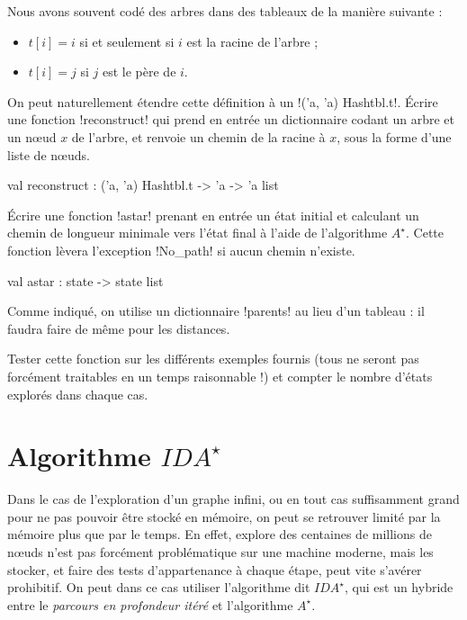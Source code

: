 \begin{ques}
  Nous avons souvent codé des arbres dans des tableaux de la manière
  suivante :
  \begin{itemize}
    \item $t[i] = i$ si et seulement si $i$ est la racine de l'arbre ;
    \item $t[i] = j$ si $j$ est le père de $i$.
  \end{itemize}
  On peut naturellement étendre cette définition à un
  \ml!('a, 'a) Hashtbl.t!. Écrire une fonction \ml!reconstruct!
  qui prend en entrée un dictionnaire codant un arbre et un
  nœud $x$ de l'arbre, et renvoie un chemin de la racine à $x$,
  sous la forme d'une liste de nœuds.
\begin{ocaml}
val reconstruct : ('a, 'a) Hashtbl.t -> 'a -> 'a list
\end{ocaml}
\end{ques}

\begin{ques}
  Écrire une fonction \ml!astar! prenant en entrée un état initial
  et calculant un chemin de longueur minimale vers l'état final à
  l'aide de l'algorithme $A^{\star}$. Cette fonction lèvera l'exception
  \ml!No_path! si aucun chemin n'existe.
\begin{ocaml}
val astar : state -> state list
\end{ocaml}
  \begin{rem}
    Comme indiqué, on utilise un dictionnaire \ml!parents!
    au lieu d'un tableau : il faudra faire de même pour les
    distances.
  \end{rem}
\end{ques}

\begin{ques}
  Tester cette fonction sur les différents exemples fournis (tous ne seront
  pas forcément traitables en un temps raisonnable !) et compter le
  nombre d'états explorés dans chaque cas.
\end{ques}


\section{Algorithme $IDA^{\star}$}

Dans le cas de l'exploration d'un graphe infini, ou en tout cas suffisamment
grand pour ne pas pouvoir être stocké en mémoire, on peut se retrouver limité
par la mémoire plus que par le temps. En effet, explore des centaines de
millions de nœuds n'est pas forcément problématique sur une machine moderne,
mais les stocker, et faire des tests d'appartenance à chaque étape, peut
vite s'avérer prohibitif. On peut dans ce cas utiliser l'algorithme dit
$IDA^{\star}$, qui est un hybride entre le \emph{parcours en profondeur itéré}
et l'algorithme $A^{\star}$.

